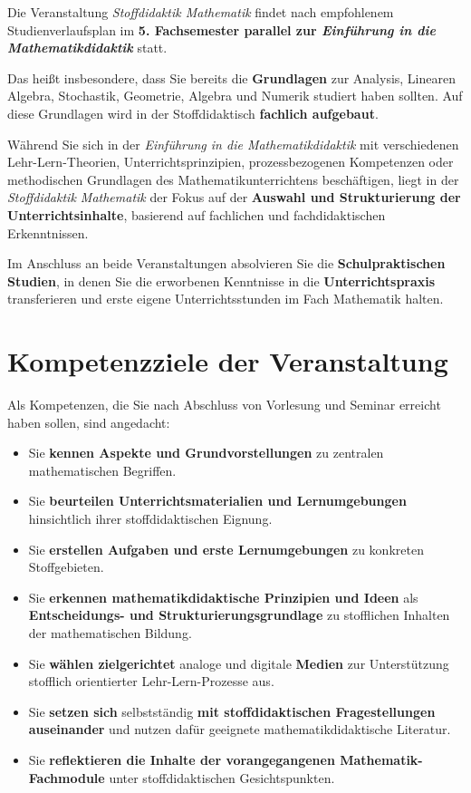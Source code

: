 \documentclass[
]{scrbook}
\providecommand{\tightlist}{%
  \setlength{\itemsep}{0pt}\setlength{\parskip}{0pt}}
\theoremstyle{definition}
\theoremstyle{definition}
\theoremstyle{definition}
\theoremstyle{definition}
\theoremstyle{remark}
\begin{document}
Die Veranstaltung \emph{Stoffdidaktik Mathematik} findet nach empfohlenem Studienverlaufsplan im \textbf{5. Fachsemester parallel zur \emph{Einführung in die Mathematikdidaktik}} statt.

Das heißt insbesondere, dass Sie bereits die \textbf{Grundlagen} zur Analysis, Linearen Algebra, Stochastik, Geometrie, Algebra und Numerik studiert haben sollten. Auf diese Grundlagen wird in der Stoffdidaktisch \textbf{fachlich aufgebaut}.

Während Sie sich in der \emph{Einführung in die Mathematikdidaktik} mit verschiedenen Lehr-Lern-Theorien, Unterrichtsprinzipien, prozessbezogenen Kompetenzen oder methodischen Grundlagen des Mathematikunterrichtens beschäftigen, liegt in der \emph{Stoffdidaktik Mathematik} der Fokus auf der \textbf{Auswahl und Strukturierung der Unterrichtsinhalte}, basierend auf fachlichen und fachdidaktischen Erkenntnissen.

Im Anschluss an beide Veranstaltungen absolvieren Sie die \textbf{Schulpraktischen Studien}, in denen Sie die erworbenen Kenntnisse in die \textbf{Unterrichtspraxis} transferieren und erste eigene Unterrichtsstunden im Fach Mathematik halten.

\hypertarget{kompetenzziele-der-veranstaltung}{%
\section*{Kompetenzziele der Veranstaltung}\label{kompetenzziele-der-veranstaltung}}

Als Kompetenzen, die Sie nach Abschluss von Vorlesung und Seminar erreicht haben sollen, sind angedacht:

\begin{itemize}
\tightlist
\item
  Sie \textbf{kennen Aspekte und Grundvorstellungen} zu zentralen mathematischen Begriffen.
\item
  Sie \textbf{beurteilen Unterrichtsmaterialien und Lernumgebungen} hinsichtlich ihrer stoffdidaktischen Eignung.
\item
  Sie \textbf{erstellen Aufgaben und erste Lernumgebungen} zu konkreten Stoffgebieten.
\item
  Sie \textbf{erkennen mathematikdidaktische Prinzipien und Ideen} als \textbf{Entscheidungs- und Strukturierungsgrundlage} zu stofflichen Inhalten der mathematischen Bildung.
\item
  Sie \textbf{wählen zielgerichtet} analoge und digitale \textbf{Medien} zur Unterstützung stofflich orientierter Lehr-Lern-Prozesse aus.
\item
  Sie \textbf{setzen sich} selbstständig \textbf{mit stoffdidaktischen Fragestellungen auseinander} und nutzen dafür geeignete mathematikdidaktische Literatur.
\item
  Sie \textbf{reflektieren die Inhalte der vorangegangenen Mathematik-Fachmodule} unter stoffdidaktischen Gesichtspunkten.
\end{itemize}
\end{document}
